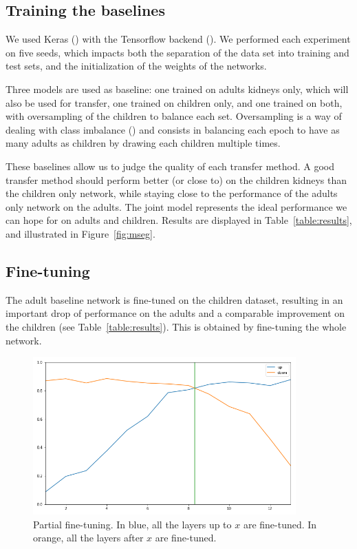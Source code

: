 \subsection{Training the baselines}
\label{ssec:training_baseline}

We used Keras (\textcite{chollet2015keras}) with the Tensorflow backend (\textcite{tensorflow2015}). We performed each experiment on five seeds, which impacts both the separation of the data set into training and test sets, and the initialization of the weights of the networks.

Three models are used as baseline: one trained on adults kidneys only, which will also be used for transfer, one trained on children only, and one trained on both, with oversampling of the children to balance each set. Oversampling is a way of dealing with class imbalance (\textcite{buda2017}) and consists in balancing each epoch to have as many adults as children by drawing each children multiple times.

These baselines allow us to judge the quality of each transfer method. A good transfer method should perform better (or close to) on the children kidneys than the children only network, while staying close to the performance of the adults only network on the adults. The joint model represents the ideal performance we can hope for on adults and children. Results are displayed in Table~\ref{table:results}, and illustrated in Figure~\ref{fig:mseg}.

\subsection{Fine-tuning}
\label{ssec:baseline_finetune}

The adult baseline network is fine-tuned on the children dataset, resulting in an important drop of performance on the adults and a comparable improvement on the children (see Table~\ref{table:results}). This is obtained by fine-tuning the whole network. 

\begin{figure}[htb]
	\includegraphics[width=0.9\textwidth]{img_transfer/partial_transfer}
    \caption{Partial fine-tuning. In blue, all the layers up to $x$ are fine-tuned. In orange, all the layers after $x$ are fine-tuned.}
    \label{fig:partial_transfer}
\end{figure}

